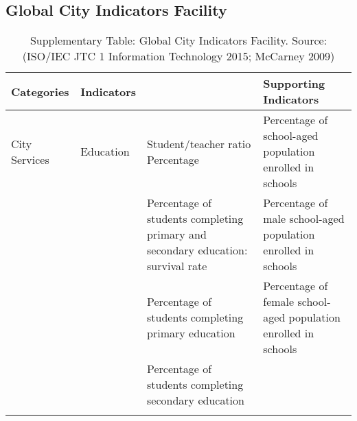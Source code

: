 \begin{landscape}

\chapter{Global City Indicators Facility} %

\label{AppendixB} %

\begin{table}[th]
\caption{Supplementary Table: Global City Indicators Facility. Source: (ISO/IEC JTC 1 Information Technology 2015; McCarney 2009)}
\begin{center}
\begin{tabular}{ >{\raggedright\arraybackslash}p{} >{\raggedright\arraybackslash}p{} >{\raggedright\arraybackslash}p{} >{\raggedright\arraybackslash}p{} } 
\hline
Categories & Indicators &  & Supporting Indicators \\
\hline
City Services & Education & Student/teacher ratio Percentage & Percentage of school-aged population enrolled in schools \\
  &  & Percentage of students completing primary and secondary education: survival rate & Percentage of male school-aged population enrolled in schools \\
  &  & Percentage of students completing primary education & Percentage of female school-aged population enrolled in schools \\
  &  & Percentage of students completing secondary education &  \\
\hline
\label{tbl:globalCityIndicatorsFacility0}
\end{tabular}
\end{center}
\end{table}


\end{landscape}
